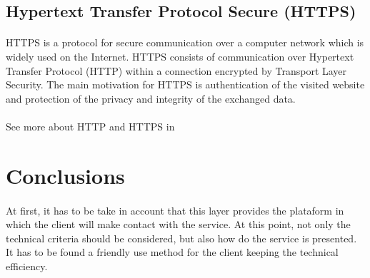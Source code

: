 \subsection{Hypertext Transfer Protocol Secure (HTTPS)}
\paragraph{}HTTPS is a protocol for secure communication over a computer network which is widely used on the Internet. HTTPS consists of communication over Hypertext Transfer Protocol (HTTP) within a connection encrypted by Transport Layer Security. The main motivation for HTTPS is authentication of the visited website and protection of the privacy and integrity of the exchanged data.
\paragraph{}See more about HTTP and HTTPS in \cite{HTTPS}

\section{Conclusions} 
\paragraph{}At first, it has to be take in account that this layer provides the plataform in which the client will make contact with the service. At this point, not only the technical criteria should be considered, but also how do the service is presented. It has to be found a friendly use method for the client keeping the technical efficiency.
